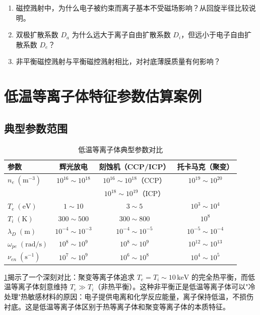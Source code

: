 \documentclass[12pt,a4paper,openany,oneside]{book}
\begin{document}
\begin{miniquiz}
\begin{enumerate}
\item 磁控溅射中，为什么电子被约束而离子基本不受磁场影响？从回旋半径比较说明。
\item 双极扩散系数 $D_a$ 为什么远大于离子自由扩散系数 $D_i$，但远小于电子自由扩散系数 $D_e$？
\item 非平衡磁控溅射与平衡磁控溅射相比，对衬底薄膜质量有何影响？
\end{enumerate}
\end{miniquiz}

\section{低温等离子体特征参数估算案例}

\subsection{典型参数范围}

\begin{table}[htbp]
\centering
\caption{低温等离子体典型参数对比}
\label{tab:plasma-params}
\begin{tabular}{lccc}
\toprule
\textbf{参数} & \textbf{辉光放电} & \textbf{刻蚀机（CCP/ICP）} & \textbf{托卡马克（聚变）} \\
\midrule
$n_e\;(\mathrm{m^{-3}})$ & $10^{16}\sim 10^{18}$ & $10^{16}\sim 10^{18}$（CCP）& $10^{19}\sim 10^{20}$ \\
& & $10^{18}\sim 10^{19}$（ICP）& \\
$T_e\;(\mathrm{eV})$ & $1\sim 10$ & $3\sim 5$ & $10^3\sim 10^4$ \\
$T_i\;(\mathrm{K})$ & $300\sim 500$ & $300\sim 800$ & $10^8$ \\
$\lambda_D\;(\mathrm{m})$ & $10^{-4}\sim 10^{-3}$ & $10^{-4}\sim 10^{-5}$ & $10^{-5}\sim 10^{-4}$ \\
$\omega_{pe}\;(\mathrm{rad/s})$ & $10^8\sim 10^9$ & $10^8\sim 10^9$ & $10^{12}\sim 10^{13}$ \\
$\nu_{en}\;(\mathrm{s^{-1}})$ & $10^7\sim 10^9$ & $10^6\sim 10^8$ & $10^4\sim 10^5$ \\
\bottomrule
\end{tabular}
\end{table}

\begin{insight}{}{}
\cref{tab:plasma-params}揭示了一个深刻对比：聚变等离子体追求 $T_e = T_i \sim 10\,\mathrm{keV}$ 的完全热平衡，而低温等离子体刻意维持 $T_e \gg T_i$（非热平衡）。这种非平衡正是低温等离子体可以"冷处理"热敏感材料的原因：电子提供电离和化学反应能量，离子保持低温，不损伤衬底。这是低温等离子体区别于热等离子体和聚变等离子体的本质特征。
\end{insight}
\end{document}
